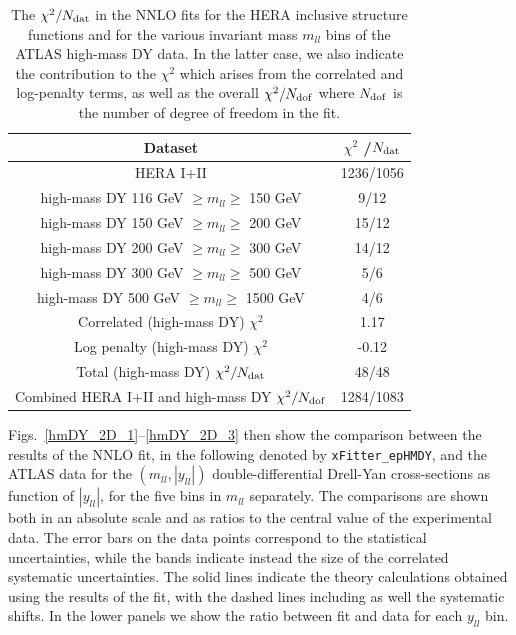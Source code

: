 \begin{table}[t]
  \centering
  \begin{tabular}{|c|c|}
    \hline
    Dataset  &   $\chi^2$ /$N_{\rm dat}$ \\
    \hline
    \hline
    HERA I+II & 1236/1056\\
    \hline
    high-mass DY  116 GeV $\ge m_{ll} \ge $ 150 GeV  &  9/12 \\
    high-mass DY  150 GeV $\ge m_{ll} \ge $ 200 GeV  &  15/12 \\
    high-mass DY  200 GeV $\ge m_{ll} \ge $ 300 GeV  &  14/12 \\
    high-mass DY  300 GeV $\ge m_{ll} \ge $ 500 GeV  &  5/6 \\
    high-mass DY  500 GeV $\ge m_{ll} \ge $ 1500 GeV &  4/6 \\
    \hline
    Correlated (high-mass DY) $\chi^2$ & 1.17 \\
    Log penalty (high-mass DY) $\chi^2$  & -0.12 \\
    \hline
    Total  (high-mass DY) $\chi^2/N_{\rm dat}$  & 48/48 \\
    \hline
    \hline
    Combined HERA I+II and high-mass DY $\chi^2/N_{\rm dof}$   & 1284/1083 \\
    \hline
    \end{tabular}
  \caption{The $\chi^{2}/N_{\rm dat}$ in the NNLO fits for the
    HERA inclusive structure functions and for the various
    invariant mass $m_{ll}$ bins of the ATLAS high-mass DY data.
    In the latter case, we also indicate the contribution to the
    $\chi^2$ which arises from the correlated and log-penalty terms,
    as well as the overall $\chi^2/N_{\rm dof}$ where $N_{\rm dof}$ is
    the number of degree of freedom in the fit.
\label{tab:chi2fit}
  }
\end{table}

Figs.~\ref{hmDY_2D_1}--\ref{hmDY_2D_3} then show the
comparison between the results of the NNLO fit, in the following
denoted by {\tt xFitter\_epHMDY},
and the ATLAS data
  for the $(m_{ll},|y_{ll}|)$ double-differential Drell-Yan cross-sections
  as function of $|y_{ll}|$, for the five bins in $m_{ll}$ separately.
  The comparisons are shown both
  in an absolute scale  and as ratios to the central value
  of the experimental data.
  The error bars on the data points correspond to the statistical
  uncertainties, while the bands
  indicate instead the size of the correlated systematic uncertainties.
  The solid lines indicate the theory calculations obtained using the results
  of the fit, with the dashed lines including as well the systematic shifts.
  In the lower panels we show the ratio between fit and data for each $y_{ll}$ bin.


